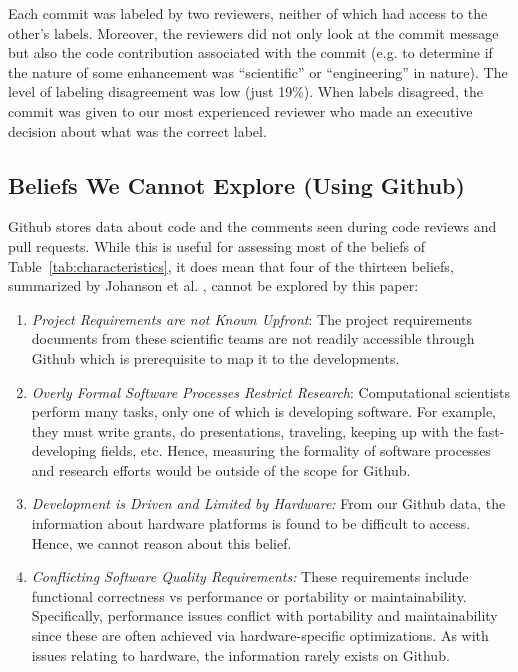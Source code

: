 \documentclass[conference,10pt]{IEEEtran}
\newcommand{\be}{\begin{enumerate}}
\newcommand{\ee}{\end{enumerate}}
\begin{document}
 

Each commit was labeled by two reviewers,
neither of which had access to the other's labels. Moreover, the reviewers did not only look at the commit message but also the code contribution associated with the commit (e.g. to determine if the nature of some enhancement was 
``scientific'' or ``engineering'' in nature). The level of
labeling disagreement was low (just 19\%). When labels disagreed, the commit was given to our most experienced reviewer who made an executive decision about what
was the correct label.

\subsection{Beliefs We Cannot Explore (Using Github)}

Github stores data about code and the comments seen during code reviews and pull requests. While this is useful for assessing most of the beliefs of Table~\ref{tab:characteristics}, it does mean that four of the thirteen beliefs, summarized by Johanson et al. \cite{johan18_secs}, cannot be explored by this paper:

\be
\item {\em Project Requirements are not Known Upfront}: The project requirements documents from these scientific teams are not readily accessible through Github which is prerequisite to map it to the developments.   
\item {\em Overly Formal Software Processes Restrict Research}: Computational scientists perform many tasks,
only one of which is developing software. For example,
they must write grants, do presentations, traveling, keeping up with the fast-developing fields, etc. Hence, measuring the formality of software processes and research efforts would be outside of the scope for Github.
\item {\em Development is Driven and Limited by Hardware:}
From our Github data, the information about hardware platforms is found to be difficult to access. Hence, we cannot reason about this belief.
\item {\em Conflicting Software Quality Requirements:} These requirements include functional correctness vs
performance or portability or maintainability. Specifically, performance issues conflict with portability and maintainability since these are often achieved via hardware-specific optimizations. As with issues
relating to hardware,
the information rarely exists on Github. 
\ee
\end{document}
